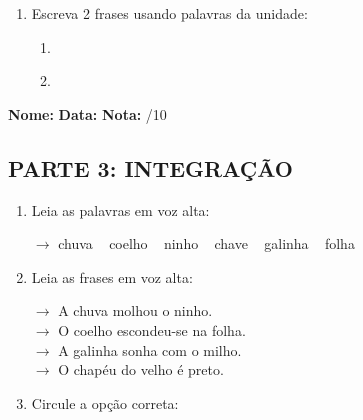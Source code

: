 \begin{exercicio}
\begin{enumerate}[resume]
  \item Escreva 2 frases usando palavras da unidade:
  \begin{enumerate}[label=\alph*)]
    \item \underline{\hspace{8cm}}
    \item \underline{\hspace{8cm}}
  \end{enumerate}

\end{enumerate}

\end{exercicio}



\begin{exercicio}

\noindent\textbf{Nome:} \underline{\hspace{3.2cm}} \quad \textbf{Data:} \underline{\hspace{1.6cm}} \quad \textbf{Nota:} \underline{\hspace{0.9cm}}/10


\subsection*{PARTE 3: INTEGRAÇÃO}

\begin{enumerate}[resume]

  \item Leia as palavras em voz alta:
  \begin{center}
  $\rightarrow$ chuva ~ coelho ~ ninho ~ chave ~ galinha ~ folha
  \end{center}

  \item Leia as frases em voz alta:
  \begin{center}
  $\rightarrow$ A chuva molhou o ninho.\\
  $\rightarrow$ O coelho escondeu-se na folha.\\
  $\rightarrow$ A galinha sonha com o milho.\\
  $\rightarrow$ O chapéu do velho é preto.\\
  \end{center}

  \item Circule a opção correta:
  \begin{enumerate}[label=(\alph*)]


\end{enumerate}
\end{enumerate}
\end{exercicio}
